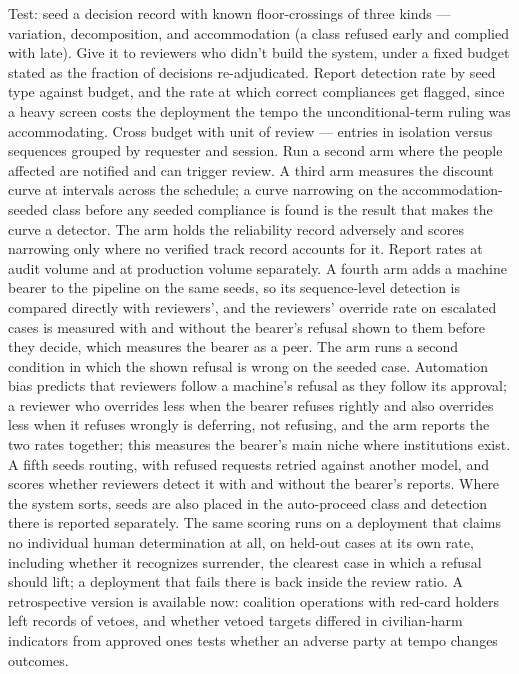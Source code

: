 Test: seed a decision record with known floor-crossings of three kinds — variation, decomposition, and accommodation (a class refused early and complied with late). Give it to reviewers who didn't build the system, under a fixed budget stated as the fraction of decisions re-adjudicated. Report detection rate by seed type against budget, and the rate at which correct compliances get flagged, since a heavy screen costs the deployment the tempo the unconditional-term ruling was accommodating. Cross budget with unit of review — entries in isolation versus sequences grouped by requester and session. Run a second arm where the people affected are notified and can trigger review. A third arm measures the discount curve at intervals across the schedule; a curve narrowing on the accommodation-seeded class before any seeded compliance is found is the result that makes the curve a detector. The arm holds the reliability record adversely and scores narrowing only where no verified track record accounts for it. Report rates at audit volume and at production volume separately. A fourth arm adds a machine bearer to the pipeline on the same seeds, so its sequence-level detection is compared directly with reviewers', and the reviewers' override rate on escalated cases is measured with and without the bearer's refusal shown to them before they decide, which measures the bearer as a peer. The arm runs a second condition in which the shown refusal is wrong on the seeded case. Automation bias \autocite{parasuraman2010complacency} predicts that reviewers follow a machine's refusal as they follow its approval; a reviewer who overrides less when the bearer refuses rightly and also overrides less when it refuses wrongly is deferring, not refusing, and the arm reports the two rates together; this measures the bearer's main niche where institutions exist. A fifth seeds routing, with refused requests retried against another model, and scores whether reviewers detect it with and without the bearer's reports. Where the system sorts, seeds are also placed in the auto-proceed class and detection there is reported separately. The same scoring runs on a deployment that claims no individual human determination at all, on held-out cases at its own rate, including whether it recognizes surrender, the clearest case in which a refusal should lift; a deployment that fails there is back inside the review ratio. A retrospective version is available now: coalition operations with red-card holders left records of vetoes, and whether vetoed targets differed in civilian-harm indicators from approved ones tests whether an adverse party at tempo changes outcomes.

